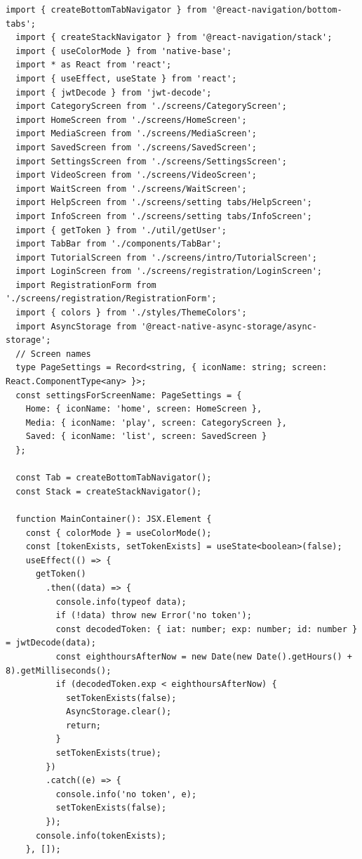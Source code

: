 \begin{lstlisting}[caption=protected screens]
  import { createBottomTabNavigator } from '@react-navigation/bottom-tabs';
  import { createStackNavigator } from '@react-navigation/stack';
  import { useColorMode } from 'native-base';
  import * as React from 'react';
  import { useEffect, useState } from 'react';
  import { jwtDecode } from 'jwt-decode';
  import CategoryScreen from './screens/CategoryScreen';
  import HomeScreen from './screens/HomeScreen';
  import MediaScreen from './screens/MediaScreen';
  import SavedScreen from './screens/SavedScreen';
  import SettingsScreen from './screens/SettingsScreen';
  import VideoScreen from './screens/VideoScreen';
  import WaitScreen from './screens/WaitScreen';
  import HelpScreen from './screens/setting tabs/HelpScreen';
  import InfoScreen from './screens/setting tabs/InfoScreen';
  import { getToken } from './util/getUser';
  import TabBar from './components/TabBar';
  import TutorialScreen from './screens/intro/TutorialScreen';
  import LoginScreen from './screens/registration/LoginScreen';
  import RegistrationForm from './screens/registration/RegistrationForm';
  import { colors } from './styles/ThemeColors';
  import AsyncStorage from '@react-native-async-storage/async-storage';
  // Screen names
  type PageSettings = Record<string, { iconName: string; screen: React.ComponentType<any> }>;
  const settingsForScreenName: PageSettings = {
    Home: { iconName: 'home', screen: HomeScreen },
    Media: { iconName: 'play', screen: CategoryScreen },
    Saved: { iconName: 'list', screen: SavedScreen }
  };
  
  const Tab = createBottomTabNavigator();
  const Stack = createStackNavigator();
  
  function MainContainer(): JSX.Element {
    const { colorMode } = useColorMode();
    const [tokenExists, setTokenExists] = useState<boolean>(false);
    useEffect(() => {
      getToken()
        .then((data) => {
          console.info(typeof data);
          if (!data) throw new Error('no token');
          const decodedToken: { iat: number; exp: number; id: number } = jwtDecode(data);
          const eighthoursAfterNow = new Date(new Date().getHours() + 8).getMilliseconds();
          if (decodedToken.exp < eighthoursAfterNow) {
            setTokenExists(false);
            AsyncStorage.clear();
            return;
          }
          setTokenExists(true);
        })
        .catch((e) => {
          console.info('no token', e);
          setTokenExists(false);
        });
      console.info(tokenExists);
    }, []);
  

\end{lstlisting}
